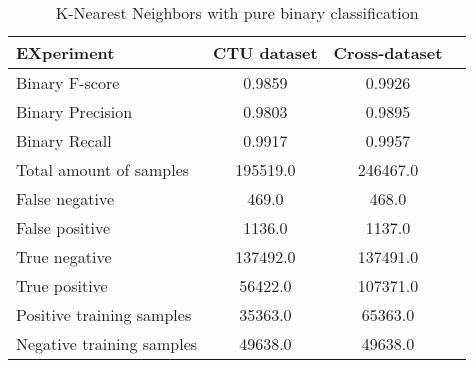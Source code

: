 \begin{table}[H]
\caption{K-Nearest Neighbors with pure binary classification}
\label{tab:one:cross}
\centering
\begin{tabular}{l c c r}
\toprule
EXperiment & CTU dataset & Cross-dataset \\
\midrule
Binary F-score & 0.9859 & 0.9926  \\
Binary Precision & 0.9803 & 0.9895 \\
Binary Recall & 0.9917 & 0.9957 \\
\midrule
Total amount of samples & 195519.0 & 246467.0 \\
False negative & 469.0 & 468.0  \\
False positive & 1136.0 & 1137.0  \\
True negative & 137492.0 & 137491.0  \\
True positive & 56422.0 & 107371.0  \\
\midrule
Positive training samples & 35363.0 & 65363.0 \\
Negative training samples & 49638.0 & 49638.0 \\
\bottomrule
\end{tabular}
\end{table}
